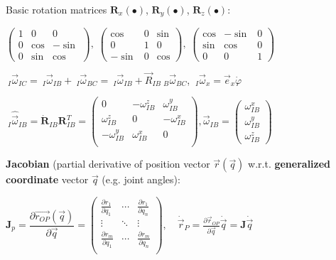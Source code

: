 \documentclass[fontsize=6pt]{scrartcl}
\newcommand{\mat}[1]{\mathbf{#1}}
\begin{document}
\begin{multicols*}{4}
 Basic rotation matrices $\mat R_x(\bullet)$, $\mat R_y(\bullet)$, $\mat R_z(\bullet)$:
 
$
	\begin{pmatrix}
	1 & 0 & 0 \\
	0 & \cos  & -\sin \\
	0 & \sin  & \cos 
	\end{pmatrix},\;
	\begin{pmatrix}
	\cos  & 0 & \sin \\
	0 & 1 & 0 \\
	-\sin & 0 & \cos
	\end{pmatrix},\;
	\begin{pmatrix}
	\cos & -\sin & 0 \\
	\sin & \cos & 0 \\
	0 & 0 & 1
	\end{pmatrix}
$

$ ~_I \vec \omega_{IC} =  ~_I \vec \omega_{IB} + ~_I \vec \omega_{BC} = ~_I \vec \omega_{IB} + \vec R_{IB} ~_B \vec \omega_{BC}$,
$ ~_I \vec{\omega}_x = \vec{e}_x \dot\varphi $

$ ~_I\hat{\vec \omega}_{IB} = \dot{\mat{R}}_{IB} \mat R_{IB}^T = 
\begin{pmatrix}
0 & -\omega_{IB}^z & \omega_{IB}^y\\
\omega_{IB}^z & 0 & -\omega_{IB}^x\\
-\omega_{IB}^y & \omega_{IB}^x & 0\\
\end{pmatrix},
\vec{\omega}_{IB}=
\begin{pmatrix}
\omega_{IB}^x\\
\omega_{IB}^y\\
\omega_{IB}^z
\end{pmatrix}
$

\textbf{Jacobian} (partial derivative of position vector $\vec{r}(\vec
q)$ w.r.t. \textbf{generalized coordinate} vector $\vec{q}$ (e.g. joint angles):

	$
	\mat J_p
	=
	\dfrac{\partial \vec{r_{OP}}(\vec q)}{\partial \vec q}
	=
	\begin{pmatrix}
	\frac{\partial r_1}{\partial q_1} & \cdots & \frac{\partial r_1}{\partial
		q_n} \\
	\vdots & \ddots & \vdots \\
	\frac{\partial r_m}{\partial q_1} & \cdots & \frac{\partial r_m}{\partial
		q_n} \\
	\end{pmatrix},
	\quad  \dot{\vec{r}}_P = \frac{\partial \vec r_{OP}}{\partial \vec q} \dot{\vec{q}} = \mat J \dot{\vec{q}} $


\end{multicols*}
\end{document}
